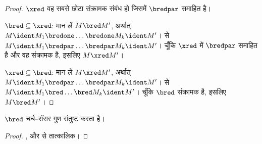 \documentclass[../../../include/open-logic-section]{subfiles}
\begin{document}
\begin{proof}
  $\xred$ वह सबसे छोटा संक्रामक संबंध हो जिसमें $\bredpar$ समाहित है।

  $\bred \subseteq \xred$: मान लें $M \bred M'$, अर्थात् $M \ident M_1
  \bredone \dots \bredone M_k \ident M'$।  से $M
  \ident M_1 \bredpar \dots \bredpar M_k \ident M'$। चूँकि $\xred$ में
  $\bredpar$ समाहित है और वह संक्रामक है, इसलिए $M \xred M'$।

  $\xred \subseteq \bred$: मान लें $M \xred M'$, अर्थात् $M \ident M_1
  \bredpar \dots \bredpar M_k \ident M'$।  से $M
  \ident M_1 \bred \dots \bred M_k \ident M'$। चूँकि $\bred$ संक्रामक
  है, इसलिए $M \bred M'$।
\end{proof}

\begin{thm}
  $\bred$ चर्च--रॉसर गुण संतुष्ट करता है।
\end{thm}

\begin{proof}
  ,  और  से तात्कालिक।
\end{proof}
\end{document}
